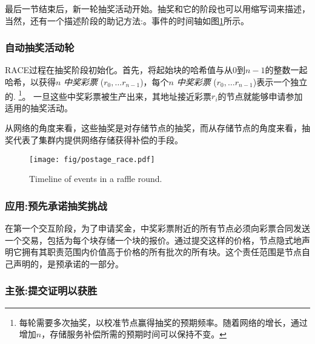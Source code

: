 最后一节结束后，新一轮抽奖活动开始。抽奖和它的阶段也可以用缩写词来描述，当然，还有一个描述阶段的助记方法:。事件的时间轴如图\ref{fig:raffle-timeline}所示。


\subsubsection{自动抽奖活动轮}

RACE过程在抽奖阶段初始化。首先，将起始块的哈希值与从$0$到$n-1$的整数一起哈希，以获得$n$ \emph{中奖彩票} ($r_0, \ldots r_{n-1}$)，每个$n$ \emph{中奖彩票} ($r_0, \ldots r_{n-1}$)表示一个独立的.%
%
\footnote{每轮需要多次抽奖，以校准节点赢得抽奖的预期频率。随着网络的增长，通过增加$n$，存储服务补偿所需的预期时间可以保持不变。}。 
%
一旦这些中奖彩票被生产出来，其地址接近彩票$r_i$的节点就能够申请参加适用的抽奖活动。


从网络的角度来看，这些抽奖是对存储节点的抽奖，而从存储节点的角度来看，抽奖代表了集群内提供网络存储获得补偿的手段。 


\begin{figure}[htbp]
  \centering
  \texttt{[image: fig/postage\_race.pdf]}
  \caption[Timeline of events in a raffle round \statusgreen]{Timeline of events in a raffle round.}
  \label{fig:raffle-timeline}
\end{figure}


\subsubsection{应用:预先承诺抽奖挑战}

在第一个交互阶段，为了申请奖金，中奖彩票附近的所有节点必须向彩票合同发送一个交易，包括为每个块存储一个块的报价。通过提交这样的价格，节点隐式地声明它拥有其职责范围内价值高于价格的所有批次的所有块。这个责任范围是节点自己声明的，是预承诺的一部分。 


\subsubsection{主张:提交证明以获胜}

